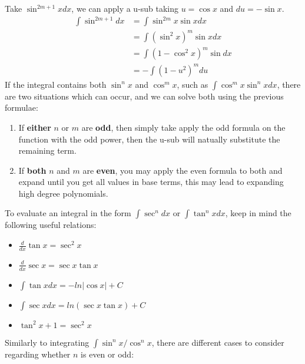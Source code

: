 \documentclass[a4paper]{article}
\begin{document}
  Take $\sin^{2m+1} xdx$, we can apply a u-sub taking $u = \cos x$ and $du = -\sin x$.
  \begin{equation}
   \begin{split}
     \int \sin^{2m+1}dx &= \int \sin^{2m} x \sin x dx \\
                        &= \int (\sin^2 x)^m \sin x dx \\
                        &= \int (1 - \cos^2 x)^m \sin dx \\
                        &= -\int (1-u^2)^m du
   \end{split} 
  \end{equation}
  If the integral contains both $\sin^n x$ and $\cos^m x$, such as $\int \cos^m x \sin^n x dx$, there are two situations which can occur, and we can solve both using the previous formulae:
  \begin{enumerate}
    \item If \textbf{either} $n$ or $m$ are \textbf{odd}, then simply take apply the odd formula on the function with the odd power, then the u-sub will natually substitute the remaining term.
    \item If \textbf{both} $n$ and $m$ are \textbf{even}, you may apply the even formula to both and expand until you get all values in base terms, this may lead to expanding high degree polynomials.
  \end{enumerate}
  To evaluate an integral in the form $\int \sec^ndx$ or $\int \tan^n x dx$, keep in mind the following useful relations:
  \begin{itemize}
    \item $\frac{d }{dx} \tan x = \sec^2 x$
    \item $\frac{d }{dx} \sec x = \sec x \tan x$
    \item $\int \tan x dx = -ln|\cos x| + C$
    \item $\int \sec x dx = ln(\sec x \tan x) + C$
    \item $\tan^2 x + 1 = \sec^2 x$
  \end{itemize}
  Similarly to integrating $\int \sin^n x/ \cos^n x$, there are different cases to consider regarding whether $n$ is even or odd:
\end{document}
